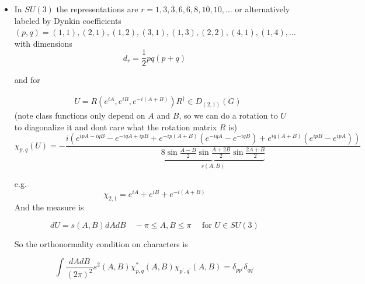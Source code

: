 \begin{itemize}
Correction have been computed up to \(\beta^{14}\) [Münster] with many types of decoration of diagrams needed

\begin{equation}
\sigma=\ln \frac{\beta}{4}+4\left(\frac{\beta}{4}\right)^{4}+\frac{176}{3}\left(\frac{\beta}{4}\right)^{8}+\cdots
\end{equation}

  \item In \(SU(3)\) the representations are \(r=1,3, \overline{3}, 6, \overline{6}, 8,10, \overline{10}, \ldots\)
  or alternatively labeled by Dynkin coefficients $(p,q) = (1,1), (2,1), (1,2), (3,1), (1,3), (2,2), (4,1), (1,4), \ldots$ with dimensions 
\begin{equation}
    d_r = \frac{1}{2}p q(p+q)
\end{equation}

and for

\begin{equation}
\begin{aligned}
& U=R\left(e^{i A}, e^{i B}, e^{-i(A+B)}\right) R^{\dagger} \in D_{(2,1)}(G)
\end{aligned}
\end{equation}
(note class functions only depend on $A$ and $B$, so we can do a rotation to $U$ to diagonalize it and dont care what the rotation matrix $R$ is)
\begin{equation}
    \chi_{p,q}(U) = -\frac{i(e^{i p A - i q B} - e^{- i q A + i p B} + e^{-ip(A+B)}(e^{-iqA} - e^{-iqB}) + e^{i q (A+B)}(e^{i p B} - e^{i p A}))}{\underset{s(A,B)}{\underbrace{8 \sin \frac{A-B}{2} \sin \frac{A+2B}{2} \sin \frac{2A+B}{2}}}}
\end{equation}

e.g.
\begin{equation}
    \chi_{2,1} = e^{iA} + e^{iB} + e^{-i(A+B)}
\end{equation}
And the measure is

\begin{equation}
d U=s(A, B) d A d B \quad-\pi \leqslant A, B \leqslant \pi \quad \text { for } U \in SU(3)
\end{equation}

So the orthonormality condition on characters is

\begin{equation}
\int \frac{d A d B}{(2 \pi)^{2}} s^{2}(A, B) \chi_{p, q}^{*}(A, B) \chi_{p^\prime, q^{\prime}}(A, B)=\delta_{p p^{\prime}} \delta_{q q^\prime}
\end{equation}


\end{itemize}
